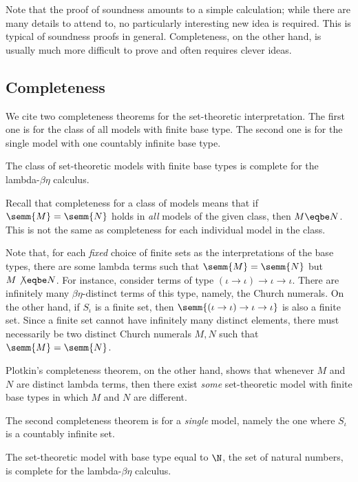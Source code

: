 \documentclass[12pt]{article}
\begin{document}
Note that the proof of soundness amounts to a simple calculation;
while there are many details to attend to, no particularly interesting
new idea is required. This is typical of soundness proofs in general. 
Completeness, on the other hand, is usually much more difficult to
prove and often requires clever ideas.

\subsection{Completeness}

We cite two completeness theorems for the set-theoretic
interpretation. The first one is for the class of all models with
finite base type. The second one is for the single model with one
countably infinite base type.

\begin{theorem}
  The class of set-theoretic models with finite base types is complete
  for the lambda-$\beta\eta$ calculus. 
\end{theorem}

Recall that completeness for a class of models means that if
$\semm{M}=\semm{N}$ holds in {\em all} models of the given class, then
$M\eqbe N$. This is not the same as completeness for each individual
model in the class. 

Note that, for each {\em fixed} choice of finite sets as the
interpretations of the base types, there are some lambda terms such
that $\semm{M}=\semm{N}$ but $M\not\eqbe N$. For instance, consider
terms of type $(\iota\to\iota)\to\iota\to\iota$. There are infinitely
many $\beta\eta$-distinct terms of this type, namely, the Church
numerals. On the other hand, if $S_{\iota}$ is a finite set, then
$\semm{(\iota\to\iota)\to\iota\to\iota}$ is also a finite set. Since a
finite set cannot have infinitely many distinct elements, there must
necessarily be two distinct Church numerals $M,N$ such that
$\semm{M}=\semm{N}$.

Plotkin's completeness theorem, on the other hand, shows that whenever
$M$ and $N$ are distinct lambda terms, then there exist {\em some}
set-theoretic model with finite base types in which $M$ and $N$ are
different.

The second completeness theorem is for a {\em single} model, namely
the one where $S_{\iota}$ is a countably infinite set.

\begin{theorem}
  The set-theoretic model with base type equal to $\N$, the set of
  natural numbers, is complete for the lambda-$\beta\eta$ calculus.
\end{theorem}
\end{document}
